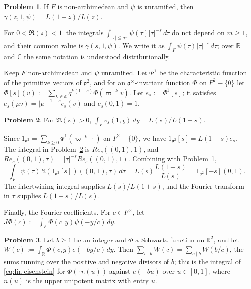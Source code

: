 \documentclass[reqno]{amsart}
\newcommand{\oo}{\mathfrak{o}}
\numberwithin{equation}{section}
\theoremstyle{definition}
\newtheorem{problem}{Problem}[section]
\theoremstyle{plain}
\begin{document}
\begin{problem}\label{pr:lin-tate}
  If $F$ is non-archimedean and $\psi$ is unramified, then $\gamma(z, 1, \psi) = L(1 - z) / L(z)$.
\end{problem}

For $0 < \Re(s) < 1$, the integrals $\int_{\lvert \tau \rvert \leq q^m} \psi(\tau) \lvert \tau \rvert^{-s} \, d \tau$ do not depend on $m \geq 1$, and their common value is $\gamma(s, 1, \psi)$.  We write it as $\int_F \psi(\tau) \lvert \tau \rvert^{-s} \, d \tau$; over $\mathbb{R}$ and $\mathbb{C}$ the same notation is understood distributionally.

Keep $F$ non-archimedean and $\psi$ unramified.  Let $\Phi^1$ be the characteristic function of the primitive vectors of $\oo^2$, and for an $\oo^\times$-invariant function $\Phi$ on $F^2 - \{0\}$ let $\Phi[s](v) := \sum_{k \in \mathbb{Z}} q^{k (1 + s)} \Phi(\varpi^{-k} v)$.  Let $e_s := \Phi^1[s]$; it satisfies $e_s(\mu v) = \lvert \mu \rvert^{-1-s} e_s(v)$ and $e_s(0, 1) = 1$.

\begin{problem}\label{pr:lin-spherical}
  For $\Re(s) > 0$, $\int_F e_s(1, y) \, d y = L(s) / L(1 + s)$.
\end{problem}

Since $1_{\oo^2} = \sum_{k \geq 0} \Phi^1(\varpi^{-k} \, \cdot)$ on $F^2 - \{0\}$, we have $1_{\oo^2}[s] = L(1 + s) e_s$.  The integral in Problem~\ref{pr:lin-spherical} is $R e_s((0, 1), 1)$, and $R e_s((0, 1), \tau) = \lvert \tau \rvert^{-s} R e_s((0, 1), 1)$.  Combining with Problem~\ref{pr:lin-tate},
\begin{equation}\label{eq:lin-forced}
  \int_F \psi(\tau) R(1_{\oo^2}[s])((0, 1), \tau) \, d \tau
  = L(s) \frac{L(1 - s)}{L(s)}
  = 1_{\oo^2}[-s](0, 1).
\end{equation}
The intertwining integral supplies $L(s) / L(1 + s)$, and the Fourier transform in $\tau$ supplies $L(1 - s) / L(s)$.

Finally, the Fourier coefficients.  For $c \in F^\times$, let $J \Phi(c) := \int_F \Phi(c, y) \psi(- y / c) \, d y$.

\begin{problem}\label{pr:lin-voronoi}
  Let $b \geq 1$ be an integer and $\Phi$ a Schwartz function on $\mathbb{R}^2$, and let $W(c) := \int_{\mathbb{R}} \Phi(c, y) e(- b y / c) \, d y$.  Then $\sum_{c \mid b} W(c) = \sum_{c \mid b} W(b / c)$, the sums running over the positive and negative divisors of $b$; this is the integral of \eqref{eq:lin-eisenstein} for $\Phi(\cdot \, n(u))$ against $e(- b u)$ over $u \in [0, 1]$, where $n(u)$ is the upper unipotent matrix with entry $u$.
\end{problem}
\end{document}
